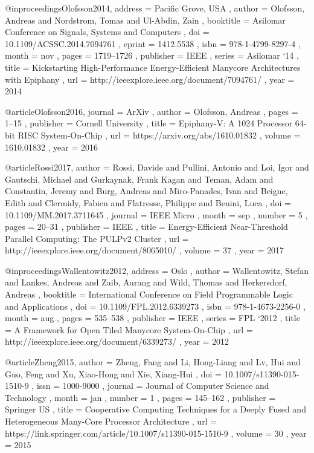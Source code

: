 @inproceedings{Olofsson2014,
    address   = { Pacific Grove, USA },
    author    = { Olofsson, Andreas and
                  Nordstrom, Tomas and
                  Ul-Abdin, Zain
    },
    booktitle = { Asilomar Conference on Signals, Systems and Computers },
    doi       = { 10.1109/ACSSC.2014.7094761 },
    eprint    = { 1412.5538 },
    isbn      = { 978-1-4799-8297-4 },
    month     = { nov },
    pages     = { 1719--1726 },
    publisher = { IEEE },
    series    = { Asilomar `14 },
    title     = { Kickstarting High-Performance Energy-Efficient Manycore Architectures with Epiphany },
    url       = { http://ieeexplore.ieee.org/document/7094761/ },
    year      = { 2014 }
}

@article{Olofsson2016,
	journal   = { ArXiv },
	author    = { Olofsson, Andreas },
	pages     = { 1--15 },
	publisher = { Cornell University },
	title     = { Epiphany-V: A 1024 Processor 64-bit RISC System-On-Chip },
	url       = { https://arxiv.org/abs/1610.01832 },
	volume    = { 1610.01832 },
	year      = { 2016 }
}

@article{Rossi2017,
	author    = { Rossi, Davide and
				  Pullini, Antonio and
				  Loi, Igor and
				  Gautschi, Michael and
				  Gurkaynak, Frank Kagan and
				  Teman, Adam and
				  Constantin, Jeremy and
				  Burg, Andreas and
				  Miro-Panades, Ivan and
				  Beigne, Edith and
				  Clermidy, Fabien and
				  Flatresse, Philippe and
				  Benini, Luca
	},
	doi       = { 10.1109/MM.2017.3711645 },
	journal   = { IEEE Micro },
	month     = { sep },
	number    = { 5 },
	pages     = { 20--31 },
	publisher = { IEEE },
	title     = { Energy-Efficient Near-Threshold Parallel Computing: The PULPv2 Cluster },
	url       = { http://ieeexplore.ieee.org/document/8065010/ },
	volume    = { 37 },
	year      = { 2017 }
}

@inproceedings{Wallentowitz2012,
    address   = { Oslo },
    author    = { Wallentowitz, Stefan and
                  Lankes, Andreas and
                  Zaib, Aurang and
                  Wild, Thomas and
                  Herkersdorf, Andreas
    },
    booktitle = { International Conference on Field Programmable Logic and Applications },
    doi       = { 10.1109/FPL.2012.6339273 },
    isbn      = { 978-1-4673-2256-0 },
    month     = { aug },
    pages     = { 535--538 },
    publisher = { IEEE },
    series    = { FPL `2012 },
    title     = { A Framework for Open Tiled Manycore System-On-Chip },
    url       = { http://ieeexplore.ieee.org/document/6339273/ },
    year      = { 2012 }
}

@article{Zheng2015,
	author    = { Zheng, Fang and
		          Li, Hong-Liang and
			      Lv, Hui and
				  Guo, Feng and
				  Xu, Xiao-Hong and
				  Xie, Xiang-Hui
	},
	doi       = { 10.1007/s11390-015-1510-9 },
	issn      = { 1000-9000 },
	journal   = { Journal of Computer Science and Technology },
	month     = { jan },
	number    = { 1 },
	pages     = { 145--162 },
	publisher = { Springer US },
	title     = { Cooperative Computing Techniques for a Deeply Fused and Heterogeneous Many-Core Processor Architecture },
	url       = { https://link.springer.com/article/10.1007/s11390-015-1510-9 },
	volume    = { 30 },
	year      = { 2015 }
}
